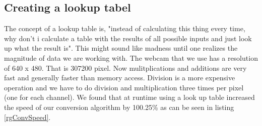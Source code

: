 \subsection{Creating a lookup tabel}
The concept of a lookup table is, "instead of calculating this thing every time, why don't i calculate a table with the results of all possible inputs and just look up what the result is". This might sound like madness until one realizes the magnitude of data we are working with. The webcam that we use has a resolution of 640 x 480. That is 307200 pixel. Now mulitplications and additions are very fast and generally faster than memory access. Division is a more expensive operation and we have to do division and multiplication three times per pixel (one for each channel). We found that at runtime using a look up table increased the speed of our conversion algorithm by 100.25\% as can be seen in listing \ref{rgConvSpeed}. 
